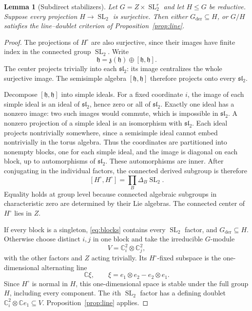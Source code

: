 \documentclass[11pt]{article}
\numberwithin{equation}{section}
\newtheorem{lemma}[theorem]{Lemma}
\theoremstyle{definition}
\theoremstyle{remark}
\newcommand{\C}{\mathbb C}
\DeclareMathOperator{\SL}{SL}
\newcommand{\der}{\mathrm{der}}
\newcommand{\frh}{\mathfrak h}
\newcommand{\sltwo}{\mathfrak{sl}_2}
\begin{document}
\begin{lemma}[Subdirect stabilizers]\label{lem:subdirect}
Let $G=Z\times\SL_2^r$ and let $H\leq G$ be reductive. Suppose every projection $H\to\SL_2$ is surjective. Then either $G_{\der}\subseteq H$, or $G/H$ satisfies the line--doublet criterion of Proposition~\ref{prop:line}.
\end{lemma}
\begin{proof}
The projections of $H^\circ$ are also surjective, since their images have finite index in the connected group $\SL_2$. Write
\[
 \frh=\mathfrak z(\frh)\oplus[\frh,\frh].
\]
The center projects trivially into each $\sltwo$: its image centralizes the whole surjective image. The semisimple algebra $[\frh,\frh]$ therefore projects onto every $\sltwo$.

Decompose $[\frh,\frh]$ into simple ideals. For a fixed coordinate $i$, the image of each simple ideal is an ideal of $\sltwo$, hence zero or all of $\sltwo$. Exactly one ideal has a nonzero image: two such images would commute, which is impossible in $\sltwo$. A nonzero projection of a simple ideal is an isomorphism with $\sltwo$. Each ideal projects nontrivially somewhere, since a semisimple ideal cannot embed nontrivially in the torus algebra. Thus the coordinates are partitioned into nonempty blocks, one for each simple ideal, and the image is diagonal on each block, up to automorphisms of $\sltwo$. These automorphisms are inner. After conjugating in the individual factors, the connected derived subgroup is therefore
\begin{equation}\label{eq:blocks}
 [H^\circ,H^\circ]=\prod_{B}\Delta_B\SL_2.
\end{equation}
Equality holds at group level because connected algebraic subgroups in characteristic zero are determined by their Lie algebras. The connected center of $H^\circ$ lies in $Z$.

If every block is a singleton, \eqref{eq:blocks} contains every $\SL_2$ factor, and $G_{\der}\subseteq H$. Otherwise choose distinct $i,j$ in one block and take the irreducible $G$-module
\[
 V=\C_i^2\otimes\C_j^2,
\]
with the other factors and $Z$ acting trivially. Its $H^\circ$-fixed subspace is the one-dimensional alternating line
\[
 \C\xi,\qquad \xi=e_1\otimes e_2-e_2\otimes e_1.
\]
Since $H^\circ$ is normal in $H$, this one-dimensional space is stable under the full group $H$, including every component. The $i$th $\SL_2$ factor has a defining doublet $\C_i^2\otimes\C e_1\subseteq V$. Proposition~\ref{prop:line} applies.
\end{proof}
\end{document}
